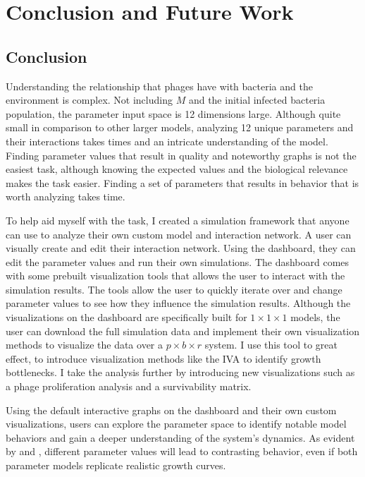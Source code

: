 \chapter{Conclusion and Future Work}
\label{CAFW}

\section{Conclusion}
\label{Conclusion}
Understanding the relationship that phages have with bacteria and the environment is complex. 
Not including $M$ and the initial infected bacteria population, the parameter input space is 12 dimensions large. 
Although quite small in comparison to other larger models, analyzing 12 unique parameters and their interactions takes times and an intricate understanding of the model. 
Finding parameter values that result in quality and noteworthy graphs is not the easiest task, although knowing the expected values and the biological relevance makes the task easier. 
Finding a set of parameters that results in behavior that is worth analyzing takes time. 

To help aid myself with the task, I created a simulation framework that anyone can use to analyze their own custom model and interaction network. 
A user can visually create and edit their interaction network. 
Using the dashboard, they can edit the parameter values and run their own simulations. 
The dashboard comes with some prebuilt visualization tools that allows the user to interact with the simulation results. 
The tools allow the user to quickly iterate over and change parameter values to see how they influence the simulation results. 
Although the visualizations on the dashboard are specifically built for $1\times 1\times 1$ models, the user can download the full simulation data and implement their own visualization methods to visualize the data over a $p\times b\times r$ system. 
I use this tool to great effect, to introduce visualization methods like the IVA to identify growth bottlenecks. 
I take the analysis further by introducing new visualizations such as a phage proliferation analysis and a survivability matrix. 

Using the default interactive graphs on the dashboard and their own custom visualizations, users can explore the parameter space to identify notable model behaviors and gain a deeper understanding of the system's dynamics. 
As evident by  and , different parameter values will lead to contrasting behavior, even if both parameter models replicate realistic growth curves. 

